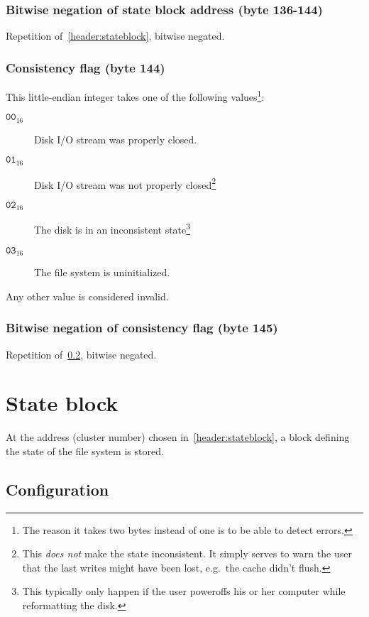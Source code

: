 \documentclass[11pt,a4paper]{report}
\begin{document}
        \subsection{Bitwise negation of state block address (byte 136-144)}
        Repetition of~\ref{header:stateblock}, bitwise negated.

        \subsection{Consistency flag (byte 144)}
        \label{header:consistency}
        This little-endian integer takes one of the following
        values\footnote{The reason it takes two bytes instead of one is to be
        able to detect errors.}:

        \begin{description}
            \item [$\texttt{00}_{16}$] Disk I/O stream was properly closed.
            \item [$\texttt{01}_{16}$] Disk I/O stream was not properly
                closed\footnote{This \emph{does not} make the state
                inconsistent. It simply serves to warn the user that the last
                writes might have been lost, e.g.\ the cache didn't flush.}
            \item [$\texttt{02}_{16}$] The disk is in an inconsistent
                state\footnote{This typically only happen if the user poweroffs
                his or her computer while reformatting the disk.}
            \item [$\texttt{03}_{16}$] The file system is uninitialized.
        \end{description}

        Any other value is considered invalid.

        \subsection{Bitwise negation of consistency flag (byte 145)}
        Repetition of~\ref{header:consistency}, bitwise negated.

    \chapter{State block}
    \label{stateblock}
    At the address (cluster number) chosen in~\ref{header:stateblock}, a block
    defining the state of the file system is stored.

    \section{Configuration}
\end{document}
